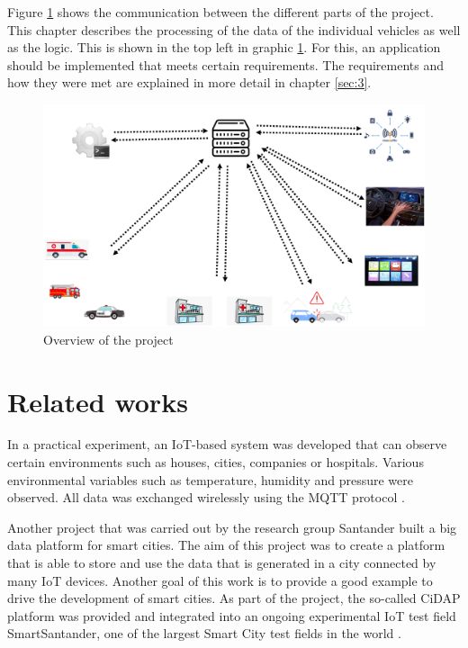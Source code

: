 Figure \ref{overview} shows the communication between the different parts of the project. This chapter describes the processing of the data of the individual vehicles as well as the logic. This is shown in the top left in graphic \ref{overview}. For this, an application should be implemented that meets certain requirements. The requirements and how they were met are explained in more detail in chapter \ref{sec:3}.


\begin{figure}
\sidecaption
\includegraphics[scale=0.4]{images/walter/uebersicht.png}
\caption{Overview of the project \cite{rettberg_2020}}
\label{overview}
\end{figure}



\section{Related works}
\label{sec:2}

In a practical experiment, an IoT-based system was developed that can observe certain environments such as houses, cities, companies or hospitals. Various environmental variables such as temperature, humidity and pressure were observed. All data was exchanged wirelessly using the MQTT protocol \cite{smartCity}.

Another project that was carried out by the research group Santander built a big data platform for smart cities. The aim of this project was to create a platform that is able to store and use the data that is generated in a city connected by many IoT devices. Another goal of this work is to provide a good example to drive the development of smart cities. 
As part of the project, the so-called CiDAP platform was provided and integrated into an ongoing experimental IoT test field SmartSantander, one of the largest Smart City test fields in the world \cite{santander}.


